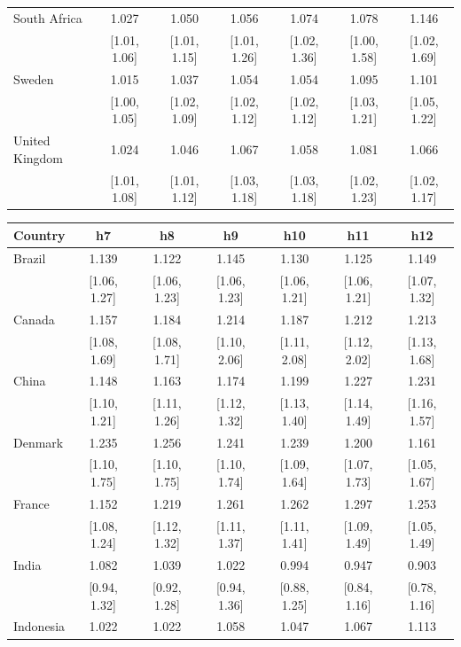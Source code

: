 \begin{table}[htbp]
{\begin{tabular*}{\textwidth}{@{\extracolsep{\fill}}lcccccc}
\addlinespace
South Africa & 1.027 & 1.050 & 1.056 & 1.074 & 1.078 & 1.146 \\
 & [1.01, 1.06] & [1.01, 1.15] & [1.01, 1.26] & [1.02, 1.36] & [1.00, 1.58] & [1.02, 1.69] \\
\addlinespace
Sweden & 1.015 & 1.037 & 1.054 & 1.054 & 1.095 & 1.101 \\
 & [1.00, 1.05] & [1.02, 1.09] & [1.02, 1.12] & [1.02, 1.12] & [1.03, 1.21] & [1.05, 1.22] \\
\addlinespace
United Kingdom & 1.024 & 1.046 & 1.067 & 1.058 & 1.081 & 1.066 \\
 & [1.01, 1.08] & [1.01, 1.12] & [1.03, 1.18] & [1.03, 1.18] & [1.02, 1.23] & [1.02, 1.17] \\
\bottomrule
\end{tabular*}

\vspace{6pt}
\begin{tabular*}{\textwidth}{@{\extracolsep{\fill}}lcccccc}
\toprule
Country & h7 & h8 & h9 & h10 & h11 & h12 \\
\midrule
Brazil & 1.139 & 1.122 & 1.145 & 1.130 & 1.125 & 1.149 \\
 & [1.06, 1.27] & [1.06, 1.23] & [1.06, 1.23] & [1.06, 1.21] & [1.06, 1.21] & [1.07, 1.32] \\
\addlinespace
Canada & 1.157 & 1.184 & 1.214 & 1.187 & 1.212 & 1.213 \\
 & [1.08, 1.69] & [1.08, 1.71] & [1.10, 2.06] & [1.11, 2.08] & [1.12, 2.02] & [1.13, 1.68] \\
\addlinespace
China & 1.148 & 1.163 & 1.174 & 1.199 & 1.227 & 1.231 \\
 & [1.10, 1.21] & [1.11, 1.26] & [1.12, 1.32] & [1.13, 1.40] & [1.14, 1.49] & [1.16, 1.57] \\
\addlinespace
Denmark & 1.235 & 1.256 & 1.241 & 1.239 & 1.200 & 1.161 \\
 & [1.10, 1.75] & [1.10, 1.75] & [1.10, 1.74] & [1.09, 1.64] & [1.07, 1.73] & [1.05, 1.67] \\
\addlinespace
France & 1.152 & 1.219 & 1.261 & 1.262 & 1.297 & 1.253 \\
 & [1.08, 1.24] & [1.12, 1.32] & [1.11, 1.37] & [1.11, 1.41] & [1.09, 1.49] & [1.05, 1.49] \\
\addlinespace
India & 1.082 & 1.039 & 1.022 & 0.994 & 0.947 & 0.903 \\
 & [0.94, 1.32] & [0.92, 1.28] & [0.94, 1.36] & [0.88, 1.25] & [0.84, 1.16] & [0.78, 1.16] \\
\addlinespace
Indonesia & 1.022 & 1.022 & 1.058 & 1.047 & 1.067 & 1.113 \\

\end{tabular*}}
\end{table}
